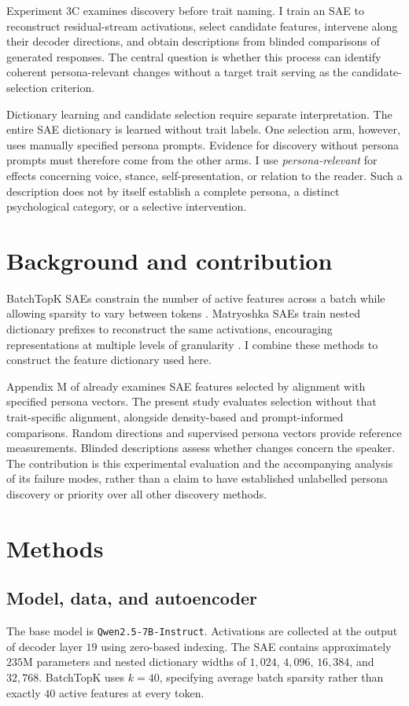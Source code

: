 \documentclass[11pt]{article}
\begin{document}
Experiment 3C examines discovery before trait naming. I train an SAE to
reconstruct residual-stream activations, select candidate features, intervene
along their decoder directions, and obtain descriptions from blinded comparisons
of generated responses. The central question is whether this process can identify
coherent persona-relevant changes without a target trait serving as the
candidate-selection criterion.

Dictionary learning and candidate selection require separate interpretation.
The entire SAE dictionary is learned without trait labels. One selection arm,
however, uses manually specified persona prompts. Evidence for discovery without
persona prompts must therefore come from the other arms. I use
\emph{persona-relevant} for effects concerning voice, stance, self-presentation,
or relation to the reader. Such a description does not by itself establish a
complete persona, a distinct psychological category, or a selective intervention.

\section{Background and contribution}
BatchTopK SAEs constrain the number of active features across a batch while
allowing sparsity to vary between tokens \citep{bussmann2024batchtopk}.
Matryoshka SAEs train nested dictionary prefixes to reconstruct the same
activations, encouraging representations at multiple levels of granularity
\citep{bussmann2025matryoshka}. I combine these methods to construct the feature
dictionary used here.

Appendix M of \citet{chen2025persona} already examines SAE features selected by
alignment with specified persona vectors. The present study evaluates selection
without that trait-specific alignment, alongside density-based and prompt-informed
comparisons. Random directions and supervised persona vectors provide reference
measurements. Blinded descriptions assess whether changes concern the speaker.
The contribution is this experimental evaluation and the accompanying analysis
of its failure modes, rather than a claim to have established unlabelled persona
discovery or priority over all other discovery methods.

\section{Methods}
\subsection{Model, data, and autoencoder}
The base model is \texttt{Qwen2.5-7B-Instruct}. Activations are collected at the
output of decoder layer $19$ using zero-based indexing. The SAE contains
approximately $235$M parameters and nested dictionary widths of $1{,}024$,
$4{,}096$, $16{,}384$, and $32{,}768$. BatchTopK uses $k=40$, specifying average
batch sparsity rather than exactly $40$ active features at every token.
\end{document}
